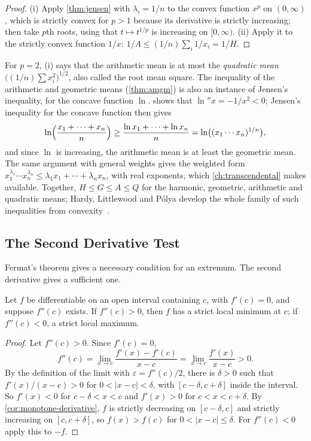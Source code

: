 \begin{proof}
(i) Apply \cref{thm:jensen} with $\lambda_i=1/n$ to the convex function $x^p$ on $(0,\infty)$, which is strictly convex for $p>1$ because its derivative is strictly increasing; then take $p$th roots, using that $t\mapsto t^{1/p}$ is increasing on $[0,\infty)$. (ii) Apply it to the strictly convex function $1/x$: $1/A\le(1/n)\sum_i1/x_i=1/H$.
\end{proof}

For $p=2$, (i) says that the arithmetic mean is at most the \emph{quadratic mean} $\bigl((1/n)\sum x_i^2\bigr)^{1/2}$, also called the root mean square. The inequality of the arithmetic and geometric means (\cref{thm:amgm}) is also an instance of Jensen's inequality, for the concave function $\ln$.  shows that $\ln''x=-1/x^2<0$; Jensen's inequality for the concave function then gives
\[
\ln\Bigl(\frac{x_1+\cdots+x_n}n\Bigr)\ge\frac{\ln x_1+\cdots+\ln x_n}n=\ln\bigl((x_1\cdots x_n)^{1/n}\bigr),
\]
and since $\ln$ is increasing, the arithmetic mean is at least the geometric mean. The same argument with general weights gives the weighted form $x_1^{\lambda_1}\cdots x_n^{\lambda_n}\le\lambda_1x_1+\cdots+\lambda_nx_n$, with real exponents, which \cref{ch:transcendental} makes available. Together, $H\le G\le A\le Q$ for the harmonic, geometric, arithmetic and quadratic means; Hardy, Littlewood and P\'olya develop the whole family of such inequalities from convexity~\cite{hardy1952inequalities}.

\subsection{The Second Derivative Test}

Fermat's theorem gives a necessary condition for an extremum. The second derivative gives a sufficient one.

\begin{theorem}
\label{thm:second-derivative-test}
Let $f$ be differentiable on an open interval containing $c$, with $f'(c)=0$, and suppose $f''(c)$ exists. If $f''(c)>0$, then $f$ has a strict local minimum at $c$; if $f''(c)<0$, a strict local maximum.
\end{theorem}

\begin{proof}
Let $f''(c)>0$. Since $f'(c)=0$,
\[
f''(c)=\lim_{x\to c}\frac{f'(x)-f'(c)}{x-c}=\lim_{x\to c}\frac{f'(x)}{x-c}>0 .
\]
By the definition of the limit with $\varepsilon=f''(c)/2$, there is $\delta>0$ such that $f'(x)/(x-c)>0$ for $0<|x-c|<\delta$, with $[c-\delta,c+\delta]$ inside the interval. So $f'(x)<0$ for $c-\delta<x<c$ and $f'(x)>0$ for $c<x<c+\delta$. By \cref{cor:monotone-derivative}, $f$ is strictly decreasing on $[c-\delta,c]$ and strictly increasing on $[c,c+\delta]$, so $f(x)>f(c)$ for $0<|x-c|\le\delta$. For $f''(c)<0$ apply this to $-f$.
\end{proof}


